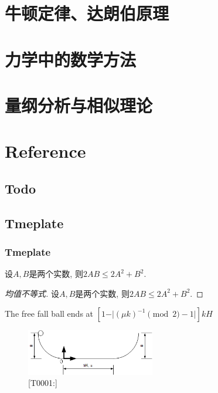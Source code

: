\documentclass[UTF8]{../06-Physics}
\begin{document}
\section{牛顿定律、达朗伯原理}
\section{力学中的数学方法}
\section{量纲分析与相似理论}



\section{Reference}

\subsection{Todo}





\subsection{Tmeplate}

\subsubsection{Tmeplate}

\begin{theorem}[均值不等式]

    设$A,B$是两个实数, 则$2AB\leq 2 A^2+B^2$.
    
\end{theorem}

\begin{proof}[均值不等式]

    设$A,B$是两个实数, 则$2AB\leq 2 A^2+B^2$.
    
\end{proof}

The free fall ball ends at $[1-\vert (\mu k)^{-1} \pmod 2 -1 \vert ]kH $

\begin{figure}[h]
    \centering
    \includegraphics[width=0.5\textwidth]{../src/T0001.png}
    \caption{[T0001:]}
    \label{fig:1}
\end{figure}
\end{document}
